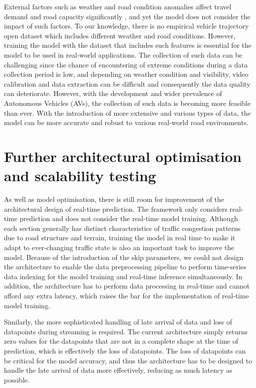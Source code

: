 \documentclass[11pt]{uonthesis}
\begin{document}
External factors such as weather and road condition anomalies affect travel demand and road capacity significantly \cite{WANG2023107044}, and yet the model does not consider the impact of such factors. To our knowledge, there is no empirical vehicle trajectory open dataset which includes different weather and road conditions. However, training the model with the dataset that includes such features is essential for the model to be used in real-world applications. The collection of such data can be challenging since the chance of encountering of extreme conditions during a data collection period is low, and depending on weather condition and visibility, video calibration and data extraction can be difficult and consequently the data quality can deteriorate. However, with the development and wider prevalence of Autonomous Vehicles (AVs), the collection of such data is becoming more feasible than ever. With the introduction of more extensive and various types of data, the model can be more accurate and robust to various real-world road environments. 

\section{Further architectural optimisation and scalability testing}

As well as model optimisation, there is still room for improvement of the architectural design of real-time prediction. The framework only considers real-time prediction and does not consider the real-time model training. Although each section generally has distinct characteristics of traffic congestion patterns due to road structure and terrain, training the model in real time to make it adapt to ever-changing traffic state is also an important task to improve the model. Because of the introduction of the skip parameters, we could not design the architecture to enable the data preprocessing pipeline to perform time-series data indexing for the model training and real-time inference simultaneously. In addition, the architecture has to perform data processing in real-time and cannot afford any extra latency, which raises the bar for the implementation of real-time model training.

Similarly, the more sophisticated handling of late arrival of data and loss of datapoints during streaming is required. The current architecture simply returns zero values for the datapoints that are not in a complete shape at the time of prediction, which is effectively the loss of datapoints. The loss of datapoints can be critical for the model accuracy, and thus the architecture has to be designed to handle the late arrival of data more effectively, reducing as much latency as possible.
\end{document}
